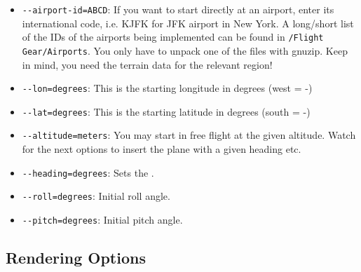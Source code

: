 \begin{itemize}

\item{\texttt{-$\!$-airport-id=ABCD}}: If you want to start directly at an airport,
  enter its international code, i.e. KJFK for JFK airport in New York.
  A long/short list of the IDs of the airports being implemented can
  be found in \texttt{/Flight Gear/Airports}. You only have to unpack
  one of the files with gnuzip. Keep in mind, you need the
  terrain data for the relevant region!

\item{\texttt{-$\!$-lon=degrees}}: This is the starting longitude in degrees (west = -)

\item{\texttt{-$\!$-lat=degrees}}: This is the starting latitude in degrees (south = -)

\item{\texttt{-$\!$-altitude=meters}}: You may start in free flight at the given
  altitude. Watch for the next options to insert the plane with a
  given heading etc.

\item{\texttt{-$\!$-heading=degrees}}: Sets the .

\item{\texttt{-$\!$-roll=degrees}}: Initial roll angle.

\item{\texttt{-$\!$-pitch=degrees}}: Initial pitch angle.

\end{itemize}

\subsection{Rendering Options}

